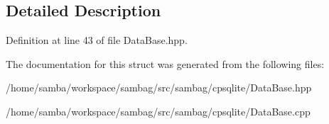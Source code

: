 \subsection{Detailed Description}


Definition at line 43 of file DataBase.hpp.



The documentation for this struct was generated from the following files:\begin{DoxyCompactItemize}
\item 
/home/samba/workspace/sambag/src/sambag/cpsqlite/DataBase.hpp\item 
/home/samba/workspace/sambag/src/sambag/cpsqlite/DataBase.cpp\end{DoxyCompactItemize}
